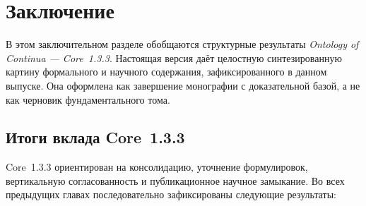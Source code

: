 
\section{Заключение}
\label{sec:conclusion}

В этом заключительном разделе обобщаются структурные результаты
\emph{Ontology of Continua --- Core~1.3.3}. Настоящая версия даёт целостную
синтезированную картину формального и научного содержания, зафиксированного в
данном выпуске. Она оформлена как завершение монографии с доказательной базой,
а не как черновик фундаментального тома.

\subsection{Итоги вклада Core~1.3.3}

Core~1.3.3 ориентирован на консолидацию, уточнение формулировок, вертикальную
согласованность и публикационное научное замыкание.
Во всех предыдущих главах последовательно зафиксированы следующие результаты:

